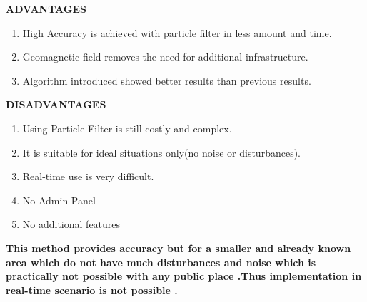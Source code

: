 ﻿\documentclass[a4paper, 12pt]{article}
\begin{document}
\textbf{ADVANTAGES}
\begin{enumerate}
	\item	High Accuracy is achieved with particle filter in less amount and time.
	\item	Geomagnetic field removes the need for additional infrastructure.
	\item	Algorithm introduced showed better results than previous results.
	
\end{enumerate}
\textbf{DISADVANTAGES}
\begin{enumerate}
	\item	Using Particle Filter is still costly and complex.
	\item	It is suitable for ideal situations only(no noise or disturbances).
	\item	Real-time use is very difficult.
	\item	No Admin Panel
	\item	No additional features		
\end{enumerate}
\textbf{This method provides accuracy but for a smaller and already known area which do not have much disturbances and noise which is practically not possible with any public place .Thus implementation in real-time scenario is not possible .}
\newpage

\begin{center}
\end{center}
\end{document}
